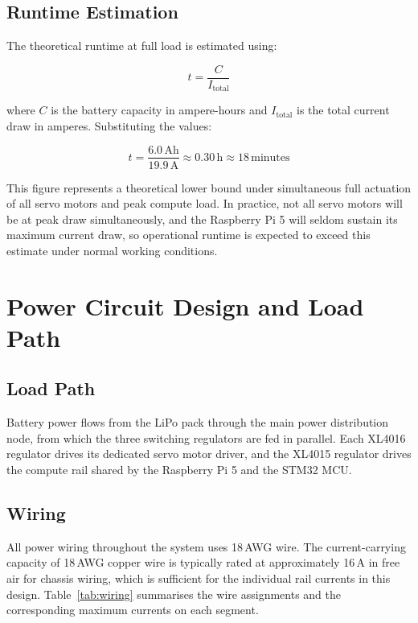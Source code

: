 \subsection{Runtime Estimation}

The theoretical runtime at full load is estimated using:

\begin{equation}
    t = \frac{C}{I_{\text{total}}}
    \label{eq:runtime}
\end{equation}

\noindent where $C$ is the battery capacity in ampere-hours and $I_{\text{total}}$ is the total 
current draw in amperes. Substituting the values:

\begin{equation}
    t = \frac{6.0\,\text{Ah}}{19.9\,\text{A}} \approx 0.30\,\text{h} \approx 18\,\text{minutes}
\end{equation}

This figure represents a theoretical lower bound under simultaneous full actuation of all servo 
motors and peak compute load. In practice, not all servo motors will be at peak draw 
simultaneously, and the Raspberry Pi 5 will seldom sustain its maximum current draw, so 
operational runtime is expected to exceed this estimate under normal working conditions.

\section{Power Circuit Design and Load Path}

\subsection{Load Path}

Battery power flows from the LiPo pack through the main power distribution node, from which 
the three switching regulators are fed in parallel. Each XL4016 regulator drives its dedicated 
servo motor driver, and the XL4015 regulator drives the compute rail shared by the Raspberry 
Pi 5 and the STM32 MCU.

\subsection{Wiring}

All power wiring throughout the system uses 18\,AWG wire. The current-carrying capacity of 
18\,AWG copper wire is typically rated at approximately 16\,A in free air for chassis wiring, 
which is sufficient for the individual rail currents in this design. Table~\ref{tab:wiring} 
summarises the wire assignments and the corresponding maximum currents on each segment.

